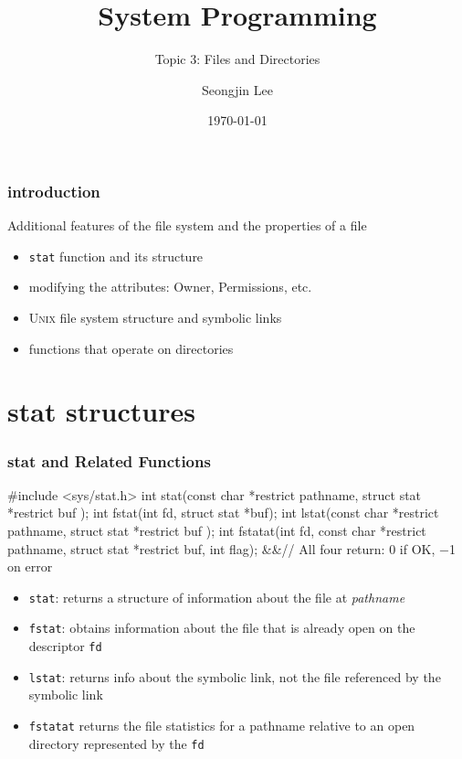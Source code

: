 \documentclass[newPxFont,sthlmFooter,nooffset]{beamer}
\title{System Programming}
\subtitle{Topic 3: Files and Directories}
\author[SJL]{Seongjin Lee}
\institute{\href{mailto:insight@gnu.ac.kr}{insight@gnu.ac.kr}\\\url{http://open.gnu.ac.kr}\\Systems Research Lab.\\Gyeongsang National University}
\date{\today}
\begin{document}
\frame[plain]{\titlepage}




\begin{frame}[t]
  \frametitle{introduction}
Additional features of the file system and the properties of a file
\begin{itemize}
\item \texttt{stat} function and its structure
\item modifying the attributes: Owner, Permissions, etc.
\item \textsc{Unix} file system structure and symbolic links
\item functions that operate on directories
\end{itemize}
\end{frame}

\section{stat structures}

\begin{frame}[containsverbatim,t]
  \frametitle{stat and Related Functions}
\begin{codedef}
#include <sys/stat.h>
int stat(const char *restrict pathname, struct stat *restrict buf );
int fstat(int fd, struct stat *buf);
int lstat(const char *restrict pathname, struct stat *restrict buf );
int fstatat(int fd, const char *restrict pathname, struct stat *restrict buf, int flag);
&&\hfill // All four return: 0 if OK, −1 on error
\end{codedef}
\begin{itemize}
\item \texttt{stat}: returns a structure of information about the file
  at \textit{pathname}

\item \texttt{fstat}: obtains information about the file that is already
  open on the descriptor \texttt{fd}

\item \texttt{lstat}: returns info about the symbolic link, not the file
  referenced by the symbolic link

\item \texttt{fstatat} returns the file statistics for a pathname relative
  to an open directory represented by the \texttt{fd}
\end{itemize}
\end{frame}
\end{document}
